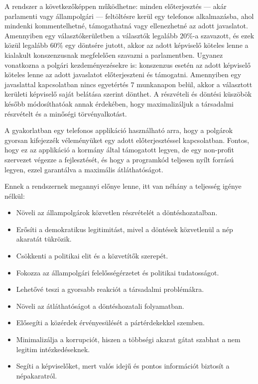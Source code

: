 A rendszer a következőképpen működhetne: minden előterjesztés --- akár parlamenti vagy állampolgári
--- feltöltésre kerül egy telefonos alkalmazásba, ahol mindenki kommentelhetné, támogathatná vagy
ellenezhetné az adott javaslatot. Amennyiben egy választókerületben a választók legalább \(20\%\)-a
szavazott, és ezek közül legalább \(60\%\) egy döntsére jutott, akkor az adott képviselő köteles lenne
a kialakult konszenzusnak megfelelően szavazni a parlamentben. Ugyanez vonatkozna a polgári
kezdeményezésekre is: konszenzus esetén az adott képviselő köteles lenne az adott javaslatot előterjeszteni
és támogatni. Amennyiben egy javaslattal kapcsolatban nincs egyetértés \(7\) munkanapon belül, akkor
a választott kerületi képviselő saját belátása szerint dönthet. A részvételi és döntési küszöbök
később módosíthatóak annak érdekében, hogy maximalizáljuk a társadalmi részvételt és a minőségi
törvényalkotást.

A gyakorlatban egy telefonos applikáció használható arra, hogy a polgárok gyorsan kifejezzék
véleményüket egy adott előterjesztéssel kapcsolatban. Fontos, hogy ez az applikáció a kormány
által támogatott legyen, de egy non-profit szervezet végezze a fejlesztését, és hogy a programkód
teljesen nyílt forrású legyen, ezzel garantálva a maximális átláthatóságot.

Ennek a rendszernek megannyi előnye lenne, itt van néhány a teljesség igénye nélkül:
\begin{itemize}
	\item Növeli az állampolgárok közvetlen részvételét a döntéshozatalban.

	\item Erősíti a demokratikus legitimitást, mivel a döntések közvetlenül a nép akaratát tükrözik.

	\item Csökkenti a politikai elit és a közvetítők szerepét.

	\item Fokozza az állampolgári felelősségérzetet és politikai tudatosságot.

	\item Lehetővé teszi a gyorsabb reakciót a társadalmi problémákra.

	\item Növeli az átláthatóságot a döntéshozatali folyamatban.

	\item Elősegíti a közérdek érvényesülését a pártérdekekkel szemben.

	\item Minimalizálja a korrupciót, hiszen a többségi akarat gátat szabhat a nem legitim intézkedéseknek.

	\item Segíti a képviselőket, mert valós idejű és pontos információt biztosít a népakaratról.

\end{itemize}

